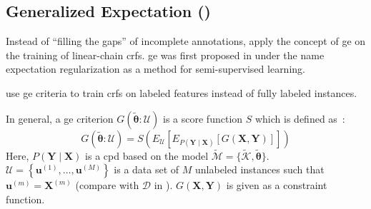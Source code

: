 \subsection{Generalized Expectation ()}

Instead of ``filling the gaps'' of incomplete annotations, \citet{mann2008generalized} apply the concept of \acrfull{ge} on the training of linear-chain \glspl{crf}.
\Gls{ge} was first proposed in \citet{mann2007simple} under the name \gls{expectation regularization} as a method for semi-supervised learning.

\citet{mann2008generalized} use \gls{ge} criteria to train \glspl{crf} on labeled features instead of fully labeled instances.

In general, a \gls{ge} criterion $G(\bm{\tilde{\theta}}:\mathcal{U})$ is a score function $S$ which is defined as~\citep{mann2010generalized}:
\begin{equation}
  \label{equ:generalized-expectation}
  G(\bm{\tilde{\theta}}:\mathcal{U})=S\left(E_{\mathcal{U}}\left[E_{P(\bm{Y}\mid\bm{X})}\left[G(\bm{X},\bm{Y})\right]\right]\right)
\end{equation}
Here, $P(\bm{Y}\mid\bm{X})$ is a \gls{cpd} based on the model $\tilde{\mathcal{M}}=\{\tilde{\mathcal{K}},\bm{\tilde{\theta}}\}$.
$\mathcal{U}=\left\{\bm{u}^{(1)},\dots,\bm{u}^{(M)}\right\}$ is a data set of $M$ unlabeled instances such that $\bm{u}^{(m)}=\bm{X}^{(m)}$ (compare with $\mathcal{D}$ in ).
$G(\bm{X},\bm{Y})$ is given as a constraint function.


